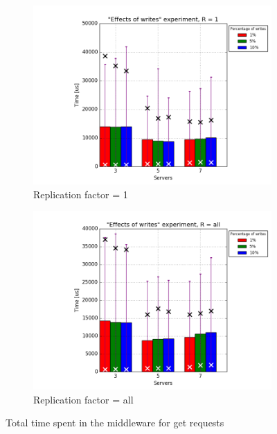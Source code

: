 \documentclass[11pt]{article}
\begin{document}
\begin{figure}
\centering
\begin{subfigure}{.5\textwidth}
	\centering
	\includegraphics[width=\linewidth]{plots/writes-get-1-replication}
	\caption{Replication factor = 1}
	\label{fig:writes-get-1}
\end{subfigure}%
\begin{subfigure}{.5\textwidth}
	\centering
	\includegraphics[width=\linewidth]{plots/writes-get-2-replication}
	\caption{Replication factor = all}
	\label{fig:writes-get-2}
\end{subfigure}
\caption{Total time spent in the middleware for get requests}
\label{fig:writes-get}
\end{figure}
\end{document}
